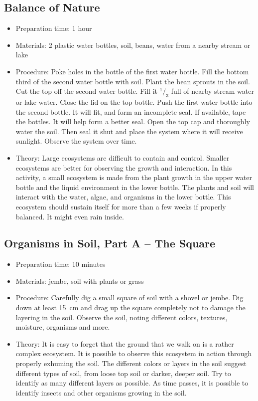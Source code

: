 \subsection{Balance of Nature}
\begin{itemize}
\item{Preparation time: 1 hour}
\item{Materials: 2 plastic water bottles, soil, beans, water from a nearby stream or lake}
\item{Procedure: Poke holes in the bottle of the first water bottle. Fill the bottom third of the second water bottle with soil. Plant the bean sprouts in the soil. Cut the top off the second water bottle. Fill it $^1/_3$ full of nearby stream water or lake water. Close the lid on the top bottle. Push the first water bottle into the second bottle. It will fit, and form an incomplete seal. If available, tape the bottles. It will help form a better seal. Open the top cap and thoroughly water the soil. Then seal it shut and place the system where it will receive sunlight. Observe the system over time.}
\item{Theory: Large ecosystems are difficult to contain and control. Smaller ecosystems are better for observing the growth and interaction. In this activity, a small ecosystem is made from the plant growth in the upper water bottle and the liquid environment in the lower bottle. The plants and soil will interact with the water, algae, and organisms in the lower bottle. This ecosystem should sustain itself for more than a few weeks if properly balanced. It might even rain inside.}
\end{itemize}

\subsection{Organisms in Soil, Part A -- The Square}
\begin{itemize}
\item{Preparation time: 10 minutes}
\item{Materials: jembe, soil with plants or grass}
\item{Procedure: Carefully dig a small square of soil with a shovel or jembe. Dig down at least 15~cm and drag up the square completely not to damage the layering in the soil. Observe the soil, noting different colors, textures, moisture, organisms and more.}
\item{Theory: It is easy to forget that the ground that we walk on is a rather complex ecosystem. It is possible to observe this ecosystem in action through properly exhuming the soil. The different colors or layers in the soil suggest different types of soil, from loose top soil or darker, deeper soil. Try to identify as many different layers as possible. As time passes, it is possible to identify insects and other organisms growing in the soil.}
\end{itemize}

